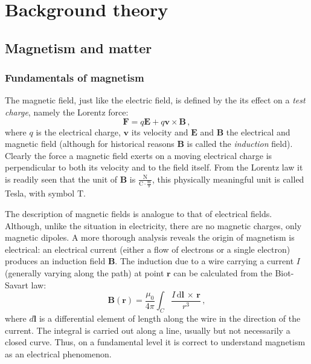 
\chapter{Background theory}

\label{ch:background}

\section{Magnetism and matter}

\subsection{Fundamentals of magnetism}

The magnetic field, just like the electric field, is defined by the its effect on a \textit{test charge}, namely the Lorentz force:
\begin{equation}
\mathbf{F} = q\mathbf{E} + q\mathbf{v}\times\mathbf{B}\, ,
\end{equation}
where $q$ is the electrical charge, $\mathbf{v}$ its velocity and $\mathbf{E}$ and $\mathbf{B}$ the electrical and magnetic field (although for historical reasons $\mathbf{B}$ is called the \textit{induction} field). Clearly the force a magnetic field exerts on a moving electrical charge is perpendicular to both its velocity and to the field itself. From the Lorentz law it is readily seen that the unit of $\mathbf{B}$ is $\frac{\mathrm{N}}{\mathrm{C}\cdot\frac{\mathrm{m}}{\mathrm{s}}}$, this physically meaningful unit is called Tesla, with symbol $\mathrm{T}$.

The description of magnetic fields is analogue to that of electrical fields. Although, unlike the situation in electricity, there are no magnetic charges, only magnetic dipoles. A more thorough analysis reveals the origin of magnetism is electrical: an electrical current (either a flow of electrons or a single electron) produces an induction field $\mathbf{B}$. The induction due to a wire carrying a current $I$ (generally varying along the path) at point $\mathbf{r}$ can be calculated from the Biot-Savart law:
\begin{equation}
\mathbf{B}(\mathbf{r}) = \frac{\mu_0}{4\pi} \int_C \frac{I\, \mathrm{d}\mathbf{l}\, \times \, \mathbf{r}}{r^3} \, ,
\end{equation}
where $d\mathbf{l}$ is a differential element of length along the wire in the direction of the current. The integral is carried out along a line, usually but not necessarily a closed curve. Thus, on a fundamental level it is correct to understand magnetism as an electrical phenomenon.\par

